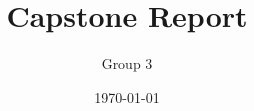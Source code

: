 \documentclass[11pt]{article}
\title{Capstone Report}
\author{Group 3}
\date{\today}
\begin{document}
\maketitle

\begin{abstract}
    
\end{abstract}

\tableofcontents
\clearpage









\appendix




\end{document}
